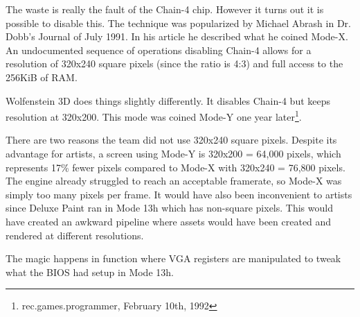 \documentclass[book.tex]{subfiles}
\begin{document}
 \par
 The waste is really the fault of the Chain-4 chip. However it turns out it is possible to disable this. The technique was popularized by Michael Abrash in Dr. Dobb's Journal of July 1991. In his article he described what he coined Mode-X. An undocumented sequence of operations disabling Chain-4 allows for a resolution of 320x240 square pixels (since the ratio is 4:3) and full access to the 256KiB of RAM.\\
 \par
 Wolfenstein 3D does things slightly differently. It disables Chain-4 but keeps resolution at 320x200. This mode was coined Mode-Y one year later\footnote{rec.games.programmer, February 10th, 1992}. \\
 \par
 There are two reasons the team did not use 320x240 square pixels. Despite its advantage for artists, a screen using Mode-Y is 320x200 = 64,000 pixels, which represents 17\% fewer pixels compared to Mode-X with 320x240 = 76,800 pixels. The engine already struggled to reach an acceptable framerate, so Mode-X was simply too many pixels per frame. It would have also been inconvenient to artists since Deluxe Paint ran in Mode 13h which has non-square pixels. This would have created an awkward pipeline where assets would have been created and rendered at different resolutions.
 \par
 \par
  \begin{minipage}{\textwidth}

\end{minipage}
 \par

The magic happens in function  where VGA registers are manipulated to tweak what the BIOS had setup in Mode 13h. \\

 \par
 \begin{minipage}{\textwidth}

\end{minipage}
\end{document}
